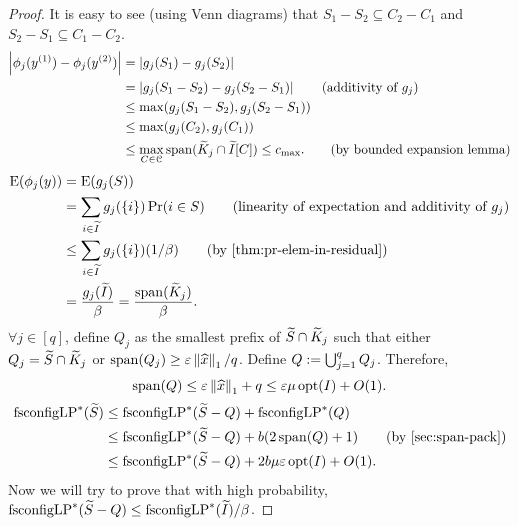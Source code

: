 \begin{proof}
It is easy to see (using Venn diagrams) that
$S_1 - S_2 \subseteq C_2 - C_1$ and $S_2 - S_1 \subseteq C_1 - C_2$.
\begin{align*}
\left\lvert \phi_j(y^{(1)}) - \phi_j(y^{(2)}) \right\rvert
&= \left\lvert g_j(S_1) - g_j(S_2) \right\rvert
\\ &= \left\lvert g_j(S_1 - S_2) - g_j(S_2 - S_1) \right\rvert  \tag{additivity of $g_j$}
\\ &\le \max(g_j(S_1 - S_2), g_j(S_2 - S_1))
\\ &\le \max(g_j(C_2), g_j(C_1))
\\ &\le \max_{C \in \mathcal{C}} \operatorname{span}(\widetilde{K}_j \cap \widetilde{I}[C])
\le c_{\max}.  \tag{by bounded expansion lemma}
\end{align*}
\begin{align*}
\E(\phi_j(y)) &= \E(g_j(S))
\\ &= \sum_{i \in \Itild} g_j(\{i\}) \Pr(i \in S)
    \tag{linearity of expectation and additivity of $g_j$}
\\ &\le \sum_{i \in \Itild} g_j(\{i\}) (1/\beta)
    \tag{by \cref{thm:pr-elem-in-residual}}
\\ &= \frac{g_j(\Itild)}{\beta} = \frac{\Span(\Ktild_j)}{\beta}.
\end{align*}
$\forall j \in [q]$, define $Q_j$ as the smallest prefix of $\widetilde{S} \cap \widetilde{K}_j$
such that either $Q_j = \widetilde{S} \cap \widetilde{K}_j$ or $\operatorname{span}(Q_j) \ge \varepsilon\left\lVert \widehat{x} \right\rVert_1/q$.
Define $Q := \bigcup_{j=1}^q Q_j$. Therefore,
\[ \operatorname{span}(Q) \le \varepsilon \left\lVert \widehat{x} \right\rVert_1 + q \le \varepsilon \mu \operatorname{opt}(I) + O(1). \]
\begin{align*}
\fscLP^*(\Stild) &\le \fscLP^*(\Stild - Q) + \fscLP^*(Q)
\\ &\le \fscLP^*(\Stild - Q) + b(2\Span(Q) + 1)  \tag{by \cref{sec:span-pack}}
\\ &\le \fscLP^*(\Stild - Q) + 2b\mu\epsLP\opt(I) + O(1).
\end{align*}
Now we will try to prove that with high probability,
$\operatorname{fsconfigLP}^*(\widetilde{S} - Q) \le \operatorname{fsconfigLP}^*(\widetilde{I})/\beta$.


\end{proof}
